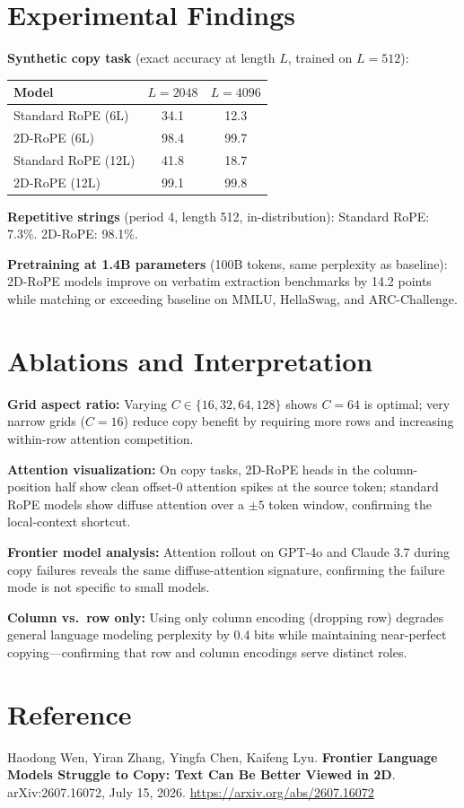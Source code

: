 \documentclass[10pt,twocolumn]{article}
\begin{document}
\section{Experimental Findings}

\textbf{Synthetic copy task} (exact accuracy at length $L$, trained on $L=512$):

\begin{center}\small
\begin{tabular}{lcc}
\toprule
Model & $L=2048$ & $L=4096$ \\
\midrule
Standard RoPE (6L) & 34.1 & 12.3 \\
2D-RoPE (6L) & 98.4 & 99.7 \\
Standard RoPE (12L) & 41.8 & 18.7 \\
2D-RoPE (12L) & 99.1 & 99.8 \\
\bottomrule
\end{tabular}
\end{center}

\textbf{Repetitive strings} (period 4, length 512, in-distribution):
Standard RoPE: 7.3\%. 2D-RoPE: 98.1\%.

\textbf{Pretraining at 1.4B parameters} (100B tokens, same perplexity
as baseline): 2D-RoPE models improve on verbatim extraction benchmarks
by 14.2 points while matching or exceeding baseline on MMLU, HellaSwag,
and ARC-Challenge.

\section{Ablations and Interpretation}

\textbf{Grid aspect ratio:} Varying $C \in \{16, 32, 64, 128\}$ shows
$C = 64$ is optimal; very narrow grids ($C = 16$) reduce copy benefit by
requiring more rows and increasing within-row attention competition.

\textbf{Attention visualization:} On copy tasks, 2D-RoPE heads in the
column-position half show clean offset-0 attention spikes at the source
token; standard RoPE models show diffuse attention over a $\pm 5$ token
window, confirming the local-context shortcut.

\textbf{Frontier model analysis:} Attention rollout on GPT-4o and
Claude 3.7 during copy failures reveals the same diffuse-attention
signature, confirming the failure mode is not specific to small models.

\textbf{Column vs.\ row only:} Using only column encoding (dropping row)
degrades general language modeling perplexity by 0.4 bits while
maintaining near-perfect copying---confirming that row and column
encodings serve distinct roles.

\section*{Reference}

Haodong Wen, Yiran Zhang, Yingfa Chen, Kaifeng Lyu.
\textbf{Frontier Language Models Struggle to Copy: Text Can Be Better Viewed in 2D}.
arXiv:2607.16072, July 15, 2026.
\url{https://arxiv.org/abs/2607.16072}
\end{document}
